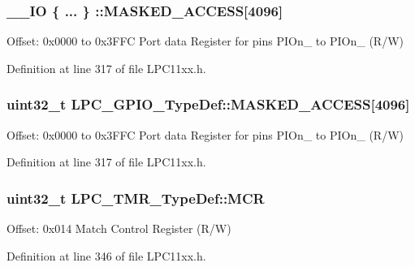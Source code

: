 \subsubsection[{\texorpdfstring{M\+A\+S\+K\+E\+D\+\_\+\+A\+C\+C\+E\+SS}{MASKED_ACCESS}}]{\setlength{\rightskip}{0pt plus 5cm}\+\_\+\+\_\+\+IO \{ ... \} \+::M\+A\+S\+K\+E\+D\+\_\+\+A\+C\+C\+E\+SS\mbox{[}4096\mbox{]}}\hypertarget{group___l_p_c11xx___definitions_gaa8b10c0d1b4d52637686fca60c7334f1}{}\label{group___l_p_c11xx___definitions_gaa8b10c0d1b4d52637686fca60c7334f1}
Offset\+: 0x0000 to 0x3\+F\+FC Port data Register for pins P\+I\+On\+\_ to P\+I\+On\+\_ (R/W) 

Definition at line 317 of file L\+P\+C11xx.\+h.

\subsubsection[{\texorpdfstring{M\+A\+S\+K\+E\+D\+\_\+\+A\+C\+C\+E\+SS}{MASKED_ACCESS}}]{ uint32\+\_\+t L\+P\+C\+\_\+\+G\+P\+I\+O\+\_\+\+Type\+Def\+::\+M\+A\+S\+K\+E\+D\+\_\+\+A\+C\+C\+E\+SS\mbox{[}4096\mbox{]}}\hypertarget{group___l_p_c11xx___definitions_ga42131a82621eb8fd5f55365654dabdba}{}\label{group___l_p_c11xx___definitions_ga42131a82621eb8fd5f55365654dabdba}
Offset\+: 0x0000 to 0x3\+F\+FC Port data Register for pins P\+I\+On\+\_ to P\+I\+On\+\_ (R/W) 

Definition at line 317 of file L\+P\+C11xx.\+h.

\subsubsection[{\texorpdfstring{M\+CR}{MCR}}]{ uint32\+\_\+t L\+P\+C\+\_\+\+T\+M\+R\+\_\+\+Type\+Def\+::\+M\+CR}\hypertarget{group___l_p_c11xx___definitions_ga898fc8d30de7119762aa61233661ded4}{}\label{group___l_p_c11xx___definitions_ga898fc8d30de7119762aa61233661ded4}
Offset\+: 0x014 Match Control Register (R/W) 

Definition at line 346 of file L\+P\+C11xx.\+h.

